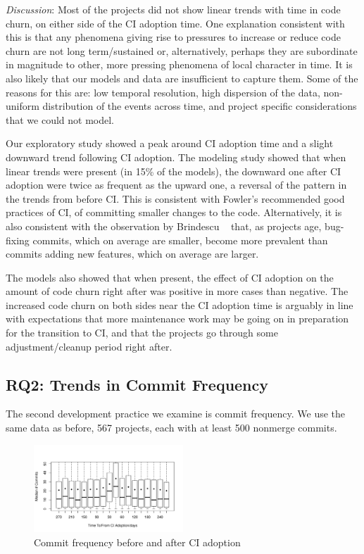 
\smallskip\noindent \emph{Discussion}:
Most of the projects did not show linear trends with time in code churn, on 
either side of the CI adoption time.
One explanation consistent with this is that any phenomena giving rise to 
pressures to increase or reduce code churn are not long term/sustained or, 
alternatively, perhaps they are subordinate in magnitude to other, more 
pressing phenomena of local character in time.
It is also likely that our models and data are insufficient to capture them.
Some of the reasons for this are: low temporal resolution, high dispersion 
of the data, non-uniform distribution of the events across time, and project 
specific considerations that we could not model.

Our exploratory study showed a peak around CI adoption time and a slight 
downward trend following CI adoption.
The modeling study showed that when linear trends were present (in 15\% 
of the models), the downward one after CI adoption were twice as frequent 
as the upward one, a reversal of the pattern in the trends from before CI.
This is consistent with Fowler's recommended good practices of CI, of 
committing smaller changes to the code.
Alternatively, it is also consistent with the observation by Brindescu 
\etal~\cite{brindescu2014centralized} that, as projects age, bug-fixing 
commits, which on average are smaller, become more prevalent than 
commits adding new features, which on average are larger.

The models also showed that when present, the effect of CI adoption on the 
amount of code churn right after was positive in more cases than negative.
The increased code churn on both sides near the CI adoption time is 
arguably in line with expectations that more maintenance work may be 
going on in preparation for the transition to CI, and that the projects go 
through some adjustment/cleanup period right after.


\subsection{RQ2: Trends in Commit Frequency}

The second development practice we examine is commit frequency.
We use the same data as before, 567 projects, each with at least 500 nonmerge commits.

\begin{figure}[!t]
\centering
\includegraphics[width=0.5\textwidth]{numbercommits.pdf}
\caption{Commit frequency before and after CI adoption}
\label{Fig:NumberCommits}
\end{figure}

